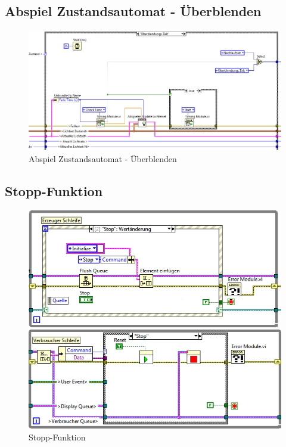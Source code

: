 	\subsection{Abspiel Zustandsautomat - Überblenden}
	\begin{figure}[!h]
	\centering
		\includegraphics[angle=90, height=0.8\textheight ]{Pics/automat-fade.png}
	\caption{Abspiel Zustandsautomat - Überblenden}
	\label{fig:a9}
	\end{figure}
	\newpage	
	
	\subsection{Stopp-Funktion}
	\begin{figure}[!h]
	\centering
		\includegraphics[width=\textwidth]{Pics/stop.png}
	\caption{Stopp-Funktion}
	\label{fig:a10}
	\end{figure}
	
